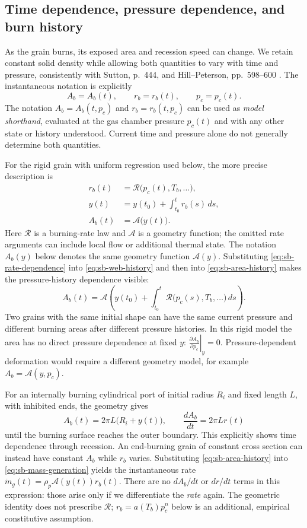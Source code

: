 \subsection{Time dependence, pressure dependence, and burn history}
\label{sec:sb-time-pressure}
As the grain burns, its exposed area and recession speed can change.
We retain constant solid density while allowing both quantities to vary
with time and pressure, consistently with Sutton, p.~444, and
Hill--Peterson, pp.~598--600 \cite{sutton,hillpeterson}. The instantaneous
notation is explicitly
\[
 A_b=A_b(t),\qquad r_b=r_b(t),\qquad p_c=p_c(t).
\]
The notation $A_b=A_b(t,p_c)$ and $r_b=r_b(t,p_c)$ can be used as
\emph{model shorthand}, evaluated at the gas chamber pressure $p_c(t)$
and with any other state or history understood. Current time and
pressure alone do not generally determine both quantities.

For the rigid grain with uniform regression used below, the more precise
description is
\begin{align}
 r_b(t)&=\mathcal R\bigl(p_c(t),T_b,\ldots\bigr),
 \label{eq:sb-rate-dependence}\\
 y(t)&=y(t_0)+\int_{t_0}^{t}r_b(s)\,ds,
 \label{eq:sb-web-history}\\
 A_b(t)&=\mathcal A\bigl(y(t)\bigr).
 \label{eq:sb-area-history}
\end{align}
Here $\mathcal R$ is a burning-rate law and $\mathcal A$ is a geometry
function; the omitted rate arguments can include local flow or additional
thermal state. The notation $A_b(y)$ below denotes the same geometry
function $\mathcal A(y)$. Substituting
\eqref{eq:sb-rate-dependence} into \eqref{eq:sb-web-history} and then into
\eqref{eq:sb-area-history} makes the pressure-history dependence visible:
\begin{equation}\label{eq:sb-area-pressure-history}
 A_b(t)=\mathcal A\left(
 y(t_0)+\int_{t_0}^{t}\mathcal R\bigl(p_c(s),T_b,\ldots\bigr)\,ds
 \right).
\end{equation}
Two grains with the same initial shape can have the same current pressure
and different burning areas after different pressure histories. In this
rigid model the area has no direct pressure dependence at fixed $y$:
$\left.\frac{\partial A_b}{\partial p_c}\right|_y=0$.
Pressure-dependent deformation would require a different geometry model,
for example $A_b=\mathcal A(y,p_c)$.

For an internally burning cylindrical port of initial radius $R_i$ and
fixed length $L$, with inhibited ends, the geometry gives
\[
 A_b(t)=2\pi L\bigl(R_i+y(t)\bigr),\qquad
 \frac{dA_b}{dt}=2\pi Lr(t)
\]
until the burning surface reaches the outer boundary. This explicitly
shows time dependence through recession. An end-burning grain of constant
cross section can instead have constant $A_b$ while $r_b$ varies.
Substituting \eqref{eq:sb-area-history} into
\eqref{eq:sb-mass-generation} yields the instantaneous rate
$\dot m_g(t)=\rho_p\mathcal A(y(t))r_b(t)$.
There are no $dA_b/dt$ or $dr/dt$ terms in this expression: those arise
only if we differentiate the \emph{rate} again. The geometric identity
does not prescribe $\mathcal R$; $r_b=a(T_b)p_c^n$ below is an additional,
empirical constitutive assumption.

